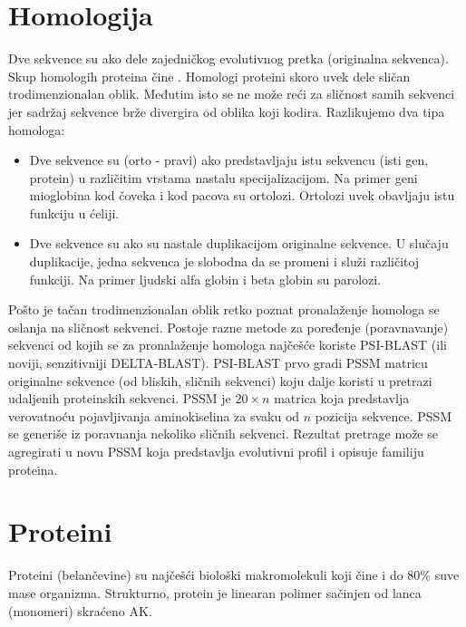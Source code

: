 \section{Homologija}

Dve sekvence su  ako dele zajedničkog evolutivnog pretka
(originalna sekvenca). Skup homologih proteina čine . Homologi proteini skoro uvek dele sličan trodimenzionalan oblik.
Međutim isto se ne može reći za sličnost samih sekvenci jer sadržaj sekvence
brže divergira od oblika koji kodira. Razlikujemo dva tipa homologa:
\begin{itemize}
  \item
    Dve sekvence su  (orto - pravi) ako predstavljaju istu
    sekvencu (isti gen, protein) u različitim vrstama nastalu specijalizacijom.
    Na primer geni mioglobina kod čoveka i kod pacova su ortolozi. Ortolozi
    uvek obavljaju istu funkciju u ćeliji.

  \item Dve sekvence su  ako su nastale duplikacijom
    originalne sekvence. U slučaju duplikacije, jedna sekvenca je slobodna
    da se promeni i služi različitoj funkciji. Na primer ljudski
    alfa globin i beta globin su parolozi.
\end{itemize}

Pošto je tačan trodimenzionalan oblik retko poznat pronalaženje homologa
se oslanja na sličnost sekvenci. Postoje razne metode za poređenje
(poravnavanje) sekvenci od kojih se za pronalaženje homologa najčešće koriste
PSI-BLAST (ili noviji, senzitivniji DELTA-BLAST).  PSI-BLAST  prvo gradi PSSM matricu
originalne sekvence (od bliskih, sličnih sekvenci) koju dalje koristi u pretrazi
udaljenih proteinskih sekvenci. PSSM  je
$20 \times n$ matrica koja predstavlja verovatnoću pojavljivanja aminokiselina
za svaku od $n$ pozicija sekvence. PSSM se generiše iz poravnanja nekoliko
sličnih sekvenci. Rezultat pretrage može se agregirati u novu PSSM koja
predstavlja evolutivni profil i opisuje familiju proteina. 

\label{sec:}
\section{Proteini}

Proteini (belančevine) su najčešći biološki makromolekuli koji čine i do $80\%$
suve mase organizma.  Strukturno, protein je linearan polimer sačinjen od lanca
 (monomeri) skraćeno AK.

